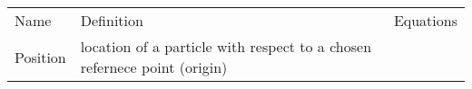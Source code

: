 \documentclass[12pt]{article}
\begin{document}
\begin{table}
	\begin{tabular}{lll}
		Name & Definition & Equations \\
		Position & location of a particle with respect to a chosen refernece point (origin) & \\
	\end{tabular}
\end{table}
\end{document}
